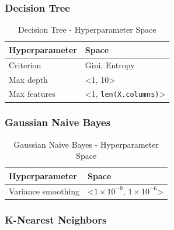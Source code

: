 \subsubsection{Decision Tree}
\begin{table}[H]
\small
\setlength{\tabcolsep}{8pt}
\renewcommand{\arraystretch}{1.3}
\centering
    \caption[Decision Tree - Hyperparameter Space]{Decision Tree - Hyperparameter Space}\label{tab:dtspace}
    \begin{tabular}{ll}
\toprule
\textbf{Hyperparameter} & \textbf{Space}\\
\midrule
\hline
Criterion & Gini, Entropy \\
Max depth & <1, 10> \\
Max features & <1, \verb|len(X.columns)|>  \\
\hline
\bottomrule
\end{tabular}
\vspace{0.7em}

\vspace{-1em}
\end{table}

\subsubsection{Gaussian Naive Bayes}

\begin{table}[H]
\small
\setlength{\tabcolsep}{8pt}
\renewcommand{\arraystretch}{1.3}
\centering
    \caption[Gaussian Naive Bayes - Hyperparameter Space]{Gaussian Naive Bayes  - Hyperparameter Space}\label{tab:gnbspace}
    \begin{tabular}{ll}
\toprule
\textbf{Hyperparameter} & \textbf{Space}\\
\midrule
\hline
Variance smoothing & <$1\times 10^{-9}$, $1\times 10^{-6}$> \\
\hline
\bottomrule
\end{tabular}
\vspace{0.7em}

\vspace{-1em}
\end{table}

\subsubsection{K-Nearest Neighbors}

